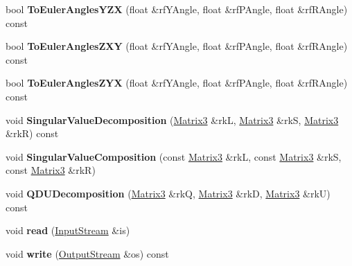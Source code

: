 \begin{DoxyCompactItemize}
\item 
bool {\bfseries To\+Euler\+Angles\+Y\+ZX} (float \&rf\+Y\+Angle, float \&rf\+P\+Angle, float \&rf\+R\+Angle) const \hypertarget{class_magnum_1_1_matrix3_ac3a6dc0d29e550d6cbb87f78c767926b}{}\label{class_magnum_1_1_matrix3_ac3a6dc0d29e550d6cbb87f78c767926b}

\item 
bool {\bfseries To\+Euler\+Angles\+Z\+XY} (float \&rf\+Y\+Angle, float \&rf\+P\+Angle, float \&rf\+R\+Angle) const \hypertarget{class_magnum_1_1_matrix3_a1e1ad2b8530c01a5161f03e9f46abdf6}{}\label{class_magnum_1_1_matrix3_a1e1ad2b8530c01a5161f03e9f46abdf6}

\item 
bool {\bfseries To\+Euler\+Angles\+Z\+YX} (float \&rf\+Y\+Angle, float \&rf\+P\+Angle, float \&rf\+R\+Angle) const \hypertarget{class_magnum_1_1_matrix3_ac8ffed0a3b1ed974cb2c66359ea3ad14}{}\label{class_magnum_1_1_matrix3_ac8ffed0a3b1ed974cb2c66359ea3ad14}

\item 
void {\bfseries Singular\+Value\+Decomposition} (\hyperlink{class_magnum_1_1_matrix3}{Matrix3} \&rkL, \hyperlink{class_magnum_1_1_matrix3}{Matrix3} \&rkS, \hyperlink{class_magnum_1_1_matrix3}{Matrix3} \&rkR) const \hypertarget{class_magnum_1_1_matrix3_a27766a7a608878c262c53d2ab657bd1a}{}\label{class_magnum_1_1_matrix3_a27766a7a608878c262c53d2ab657bd1a}

\item 
void {\bfseries Singular\+Value\+Composition} (const \hyperlink{class_magnum_1_1_matrix3}{Matrix3} \&rkL, const \hyperlink{class_magnum_1_1_matrix3}{Matrix3} \&rkS, const \hyperlink{class_magnum_1_1_matrix3}{Matrix3} \&rkR)\hypertarget{class_magnum_1_1_matrix3_a170d42745dca514bf18af33cf493e603}{}\label{class_magnum_1_1_matrix3_a170d42745dca514bf18af33cf493e603}

\item 
void {\bfseries Q\+D\+U\+Decomposition} (\hyperlink{class_magnum_1_1_matrix3}{Matrix3} \&rkQ, \hyperlink{class_magnum_1_1_matrix3}{Matrix3} \&rkD, \hyperlink{class_magnum_1_1_matrix3}{Matrix3} \&rkU) const \hypertarget{class_magnum_1_1_matrix3_a82b8de244e3f77a435267b0b73da37cb}{}\label{class_magnum_1_1_matrix3_a82b8de244e3f77a435267b0b73da37cb}

\item 
void {\bfseries read} (\hyperlink{class_magnum_1_1_input_stream}{Input\+Stream} \&is)\hypertarget{class_magnum_1_1_matrix3_aeca95da0a0c3cc0c63595058ae6e3adc}{}\label{class_magnum_1_1_matrix3_aeca95da0a0c3cc0c63595058ae6e3adc}

\item 
void {\bfseries write} (\hyperlink{class_magnum_1_1_output_stream}{Output\+Stream} \&os) const \hypertarget{class_magnum_1_1_matrix3_a413d92e8939488f5d6147b36df1c4180}{}\label{class_magnum_1_1_matrix3_a413d92e8939488f5d6147b36df1c4180}

\end{DoxyCompactItemize}
